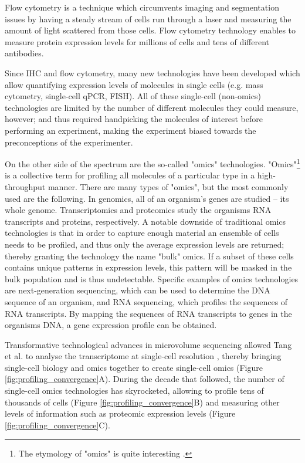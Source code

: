 Flow cytometry \cite{fulwyler_electronicseparationbiological_1965} is a technique which circumvents imaging and segmentation issues by having a steady stream of cells run through a laser and measuring the amount of light scattered from those cells. Flow cytometry technology enables to measure protein expression levels for millions of cells and tens of different antibodies. 

Since IHC and flow cytometry, many new technologies have been developed which allow quantifying expression levels of molecules in single cells (e.g. mass cytometry, single-cell qPCR, FISH). All of these single-cell (non-omics) technologies are limited by the number of different molecules they could measure, however; and thus required handpicking the molecules of interest before performing an experiment, making the experiment biased towards the preconceptions of the experimenter.

On the other side of the spectrum are the so-called "omics" technologies. "Omics"\footnote{The etymology of "omics" is quite interesting \cite{yadav_wholenesssuffixomics_2007}.} is a collective term for profiling all molecules of a particular type in a high-throughput manner. There are many types of "omics", but the most commonly used are the following. In genomics, all of an organism's genes are studied -- its whole genome. Transcriptomics and proteomics study the organisms RNA transcripts and proteins, respectively. A notable downside of traditional omics technologies is that in order to capture enough material an ensemble of cells needs to be profiled, and thus only the average expression levels are returned; thereby granting the technology the name "bulk" omics. If a subset of these cells contains unique patterns in expression levels, this pattern will be masked in the bulk population and is thus undetectable. Specific examples of omics technologies are next-generation sequencing, which can be used to determine the DNA sequence of an organism, and RNA sequencing, which profiles the sequences of RNA transcripts. By mapping the sequences of RNA transcripts to genes in the organisms DNA, a gene expression profile can be obtained.

Transformative technological advances in microvolume sequencing allowed Tang et al. to analyse the transcriptome at single-cell resolution \cite{tang_mrnaseqwholetranscriptomeanalysis_2009}, thereby bringing single-cell biology and omics together to create single-cell omics (Figure \ref{fig:profiling_convergence}A). During the decade that followed, the number of single-cell omics technologies has skyrocketed, allowing to profile tens of thousands of cells (Figure \ref{fig:profiling_convergence}B) and measuring other levels of information such as proteomic expression levels (Figure \ref{fig:profiling_convergence}C).

